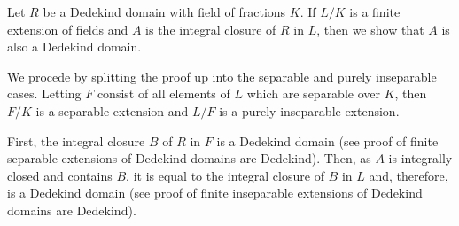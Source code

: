 \documentclass[12pt]{article}
\begin{document}
Let $R$ be a Dedekind domain with field of fractions $K$. If $L/K$ is a finite extension of fields and $A$ is the integral closure of $R$ in $L$, then we show that $A$ is also a Dedekind domain.

We procede by splitting the proof up into the separable and purely inseparable cases. Letting $F$ consist of all elements of $L$ which are separable over $K$, then $F/K$ is a separable extension and $L/F$ is a purely inseparable extension.

First, the integral closure $B$ of $R$ in $F$ is a Dedekind domain (see proof of finite separable extensions of Dedekind domains are Dedekind). Then, as $A$ is integrally closed and contains $B$, it is  equal to the integral closure of $B$ in $L$ and, therefore, is a Dedekind domain (see proof of finite inseparable extensions of Dedekind domains are Dedekind).
\end{document}
